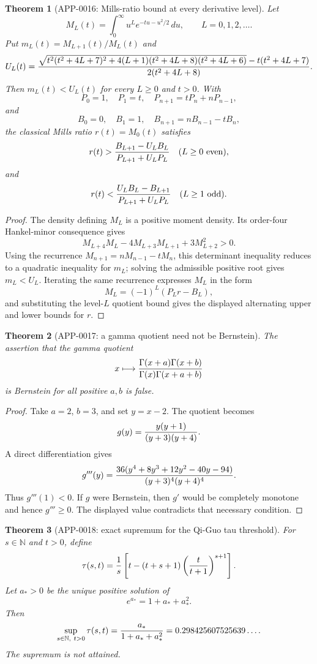 \documentclass[11pt]{article}
\numberwithin{equation}{section}
\newtheorem{theorem}{Theorem}[section]
\theoremstyle{definition}
\theoremstyle{remark}
\newcommand{\1}{\mathbf 1}
\begin{document}
\begin{theorem}[APP-0016: Mills-ratio bound at every derivative level]
\label{thm:app16-mills-all-l}
Let
\[
  M_L(t)=\int_0^\infty u^L e^{-tu-u^2/2}\,du,\qquad L=0,1,2,\ldots .
\]
Put \(m_L(t)=M_{L+1}(t)/M_L(t)\) and
\[
 U_L(t)=
 {\sqrt{t^2(t^2+4L+7)^2+4(L+1)(t^2+4L+8)(t^2+4L+6)}
       -t(t^2+4L+7)
  \over 2(t^2+4L+8)} .
\]
Then \(m_L(t)<U_L(t)\) for every \(L\ge0\) and \(t>0\).  With
\[
P_0=1,\quad P_1=t,\quad P_{n+1}=tP_n+nP_{n-1},
\]
and
\[
B_0=0,\quad B_1=1,\quad B_{n+1}=nB_{n-1}-tB_n,
\]
the classical Mills ratio \(r(t)=M_0(t)\) satisfies
\[
 r(t)>{B_{L+1}-U_LB_L\over P_{L+1}+U_LP_L}\quad(L\ge0\ {\rm even}),
\]
and
\[
 r(t)<{U_LB_L-B_{L+1}\over P_{L+1}+U_LP_L}\quad(L\ge1\ {\rm odd}).
\]
\end{theorem}

\begin{proof}
The density defining \(M_L\) is a positive moment density.  Its order-four
Hankel-minor consequence gives
\[
M_{L+4}M_L-4M_{L+3}M_{L+1}+3M_{L+2}^2>0.
\]
Using the recurrence \(M_{n+1}=nM_{n-1}-tM_n\), this determinant inequality
reduces to a quadratic inequality for \(m_L\); solving the admissible positive
root gives \(m_L<U_L\).  Iterating the same recurrence expresses \(M_L\) in the
form
\[
M_L=(-1)^L(P_L r-B_L),
\]
and substituting the level-\(L\) quotient bound gives the displayed alternating
upper and lower bounds for \(r\).
\end{proof}

\begin{theorem}[APP-0017: a gamma quotient need not be Bernstein]
\label{thm:app17-baricz-counterexample}
The assertion that the gamma quotient
\[
 x\longmapsto {\Gamma(x+a)\Gamma(x+b)\over \Gamma(x)\Gamma(x+a+b)}
\]
is Bernstein for all positive \(a,b\) is false.
\end{theorem}

\begin{proof}
Take \(a=2\), \(b=3\), and set \(y=x-2\).  The quotient becomes
\[
  g(y)={y(y+1)\over (y+3)(y+4)} .
\]
A direct differentiation gives
\[
  g'''(y)=
 {36(y^4+8y^3+12y^2-40y-94)\over (y+3)^4(y+4)^4}.
\]
Thus \(g'''(1)<0\).  If \(g\) were Bernstein, then \(g'\) would be completely
monotone and hence \(g'''\ge0\).  The displayed value contradicts that
necessary condition.
\end{proof}

\begin{theorem}[APP-0018: exact supremum for the Qi-Guo tau threshold]
\label{thm:app18-qg-tau}
For \(s\in\mathbb N\) and \(t>0\), define
\[
  \tau(s,t)={1\over s}\left[t-(t+s+1)
        \left({t\over t+1}\right)^{s+1}\right].
\]
Let \(a_*>0\) be the unique positive solution of
\[
  e^{a_*}=1+a_*+a_*^2 .
\]
Then
\[
  \sup_{s\in\mathbb N,\ t>0}\tau(s,t)
   ={a_*\over 1+a_*+a_*^2}
   =0.298425607525639\ldots .
\]
The supremum is not attained.
\end{theorem}
\end{document}
